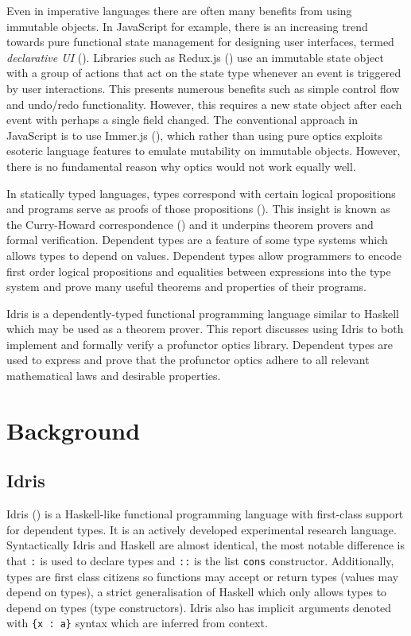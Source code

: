 \documentclass[11pt]{report}
\begin{document}
\begin{spacing}{1.15}
Even in imperative languages there are often many benefits from using immutable objects. In JavaScript for example, there is an increasing trend towards pure functional state management for designing user interfaces, termed \textit{declarative UI} (\cite{declarativeUI}). Libraries such as Redux.js (\cite{reduxjs}) use an immutable state object with a group of actions that act on the state type whenever an event is triggered by user interactions. This presents numerous benefits such as simple control flow and undo/redo functionality. However, this requires a new state object after each event with perhaps a single field changed. The conventional approach in JavaScript is to use Immer.js (\cite{immerjs}), which rather than using pure optics exploits esoteric language features to emulate mutability on immutable objects. However, there is no fundamental reason why optics would not work equally well.

In statically typed languages, types correspond with certain logical propositions and programs serve as proofs of those propositions (\cite{wadler2015propositions}). This insight is known as the Curry-Howard correspondence (\cite{sorensen2006curryhoward}) and it underpins theorem provers and formal verification. Dependent types are a feature of some type systems which allows types to depend on values. Dependent types allow programmers to encode first order logical propositions and equalities between expressions into the type system and prove many useful theorems and properties of their programs.

Idris is a dependently-typed functional programming language similar to Haskell which may be used as a theorem prover. This report discusses using Idris to both implement and formally verify a profunctor optics library. Dependent types are used to express and prove that the profunctor optics adhere to all relevant mathematical laws and desirable properties.

\section{Background}

\subsection{Idris}

Idris (\cite{brady2013idris}) is a Haskell-like functional programming language with first-class support for dependent types. It is an actively developed experimental research language. Syntactically Idris and Haskell are almost identical, the most notable difference is that \texttt{:} is used to declare types and \texttt{::} is the list \texttt{cons} constructor. Additionally, types are first class citizens so functions may accept or return types (values may depend on types), a strict generalisation of Haskell which only allows types to depend on types (type constructors). Idris also has implicit arguments denoted with \texttt{\{x : a\}} syntax which are inferred from context.


\end{spacing}
\end{document}
